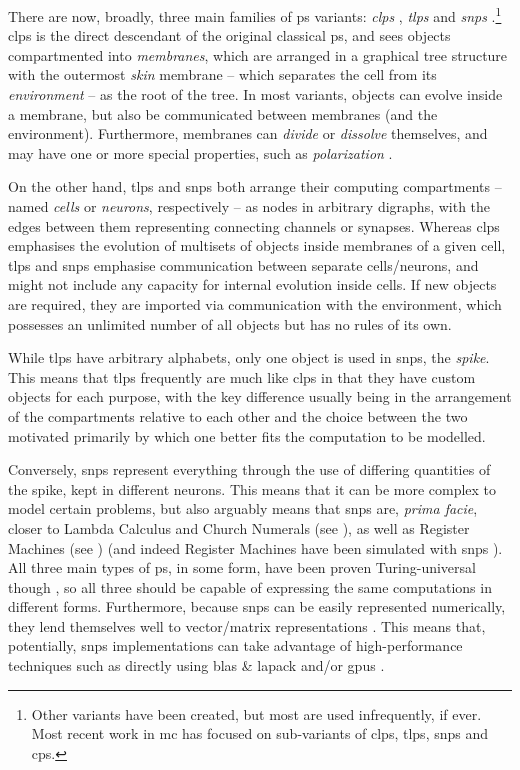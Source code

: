 There are now, broadly, three main families of \gls{ps} variants:  \emph{\gls{clps}} \cite{Paun2001,Paun2002}, \emph{\gls{tlps}} \cite{tMaPaPaRo01a,Martin-Vide2003} and \emph{\gls{snps}} \cite{Ionescu2006}.\footnote{Other variants have been created, but most are used infrequently, if ever.  Most recent work in \gls{mc} has focused on sub-variants of \gls{clps}, \gls{tlps}, \gls{snps} and \gls{cps}.}  \Gls{clps} is the direct descendant of the original classical \gls{ps}, and sees objects compartmented into \emph{membranes}, which are arranged in a graphical tree structure with the outermost \emph{skin} membrane -- which separates the cell from its \emph{environment} -- as the root of the tree.  In most variants, objects can evolve inside a membrane, but also be communicated between membranes (and the environment).  Furthermore, membranes can \emph{divide} or \emph{dissolve} themselves, and may have one or more special properties, such as \emph{polarization} \cite{Paun1999a}.

On the other hand, \gls{tlps} and \gls{snps} both arrange their computing \glspl{compartment} -- named \emph{cells} or \emph{neurons}, respectively -- as nodes in arbitrary digraphs, with the edges between them representing connecting channels or synapses.  Whereas \gls{clps} emphasises the evolution of multisets of objects inside membranes of a given cell, \gls{tlps} and \gls{snps} emphasise communication between separate cells/neurons, and might not include any capacity for internal evolution inside cells.  If new objects are required, they are imported via communication with the environment, which possesses an unlimited number of all objects but has no rules of its own.

While \gls{tlps} have arbitrary alphabets, only one object is used in \gls{snps}, the \emph{spike}.  This means that \gls{tlps} frequently are much like \gls{clps} in that they have custom objects for each purpose, with the key difference usually being in the arrangement of the \glspl{compartment} relative to each other and the choice between the two motivated primarily by which one better fits the computation to be modelled.

Conversely, \gls{snps} represent everything through the use of differing quantities of the spike, kept in different neurons.  This means that it can be more complex to model certain problems, but also arguably means that \gls{snps} are, \textit{prima facie}, closer to Lambda Calculus \cite{Barendregt1984} and Church Numerals (see \eg{} \cite{Koopman2014,Hinze2005}), as well as Register Machines (see \eg{} \cite{Korec1996}) (and indeed Register Machines have been simulated with \gls{snps} \cite{Pan2010}).  All three main types of \gls{ps}, in some form, have been proven Turing-universal though \cite{Bernardini2005,Chen2008,Freund2005}, so all three should be capable of expressing the same computations in different forms.  Furthermore, because \gls{snps} can be easily represented numerically, they lend themselves well to vector/matrix representations \cite{Zeng2010,Martinez-del-Amor2021,Gheorghe2021,Hu2016}.  This means that, potentially, \gls{snps} implementations can take advantage of high-performance techniques such as directly using \gls{blas} \& \gls{lapack} and/or \glspl{gpu} \cite{Aboy2019}.


